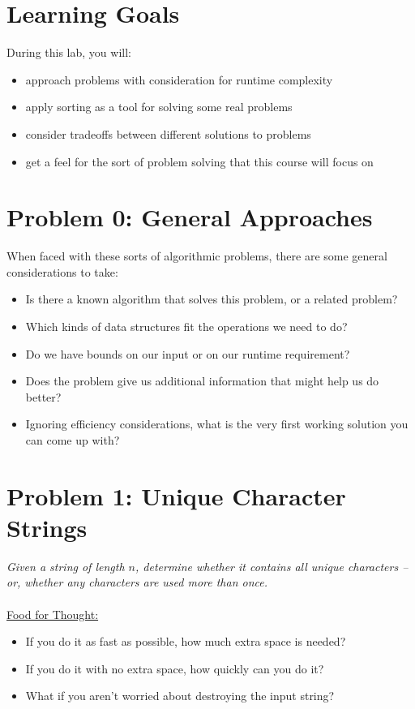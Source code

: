 


\section*{Learning Goals}
During this lab, you will:
\begin{itemize}
    \item approach problems with consideration for runtime complexity
    \item apply sorting as a tool for solving some real problems
    \item consider tradeoffs between different solutions to problems
    \item get a feel for the sort of problem solving that this course will focus on
\end{itemize}

\section*{Problem 0: General Approaches}

When faced with these sorts of algorithmic problems, there are some general considerations to take:
\begin{itemize}
    \item Is there a known algorithm that solves this problem, or a related problem?
    \item Which kinds of data structures fit the operations we need to do?
    \item Do we have bounds on our input or on our runtime requirement?
    \item Does the problem give us additional information that might help us do better?
    \item Ignoring efficiency considerations, what is the very first working solution you can come up with?
\end{itemize}

\section*{Problem 1: Unique Character Strings}
\textit{Given a string of length $n$, determine whether it contains all unique characters – or, whether any characters are used more than once.}\\\\
\uline{Food for Thought:}
\begin{itemize}
    \item If you do it as fast as possible, how much extra space is needed?
    \item If you do it with no extra space, how quickly can you do it?
    \item What if you aren't worried about destroying the input string?
\end{itemize}

